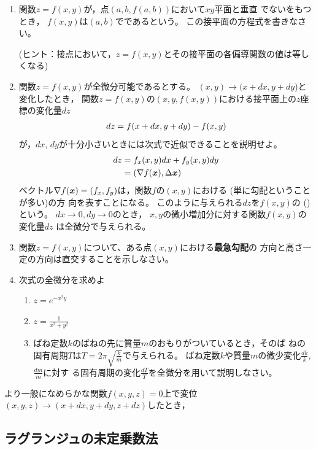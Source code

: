 \documentclass[twocolumn,11pt]{jarticle}
\begin{document}
\begin{enumerate}
\item 関数$z=f(x,y)$が，点$(a,b,f(a,b))$において$xy$平面と垂直
  でないをもつとき，
  $f(x,y)$は$(a,b)$でであるという。
  この接平面の方程式を書きなさい。

  (ヒント：接点において，$z=f(x,y)$とその接平面の各偏導関数の値は等し
  くなる)
\item 関数$z=f(x,y)$が全微分可能であるとする。
  $(x,y)\rightarrow (x+dx,y+dy$)と変化したとき，
  関数$z=f(x,y)$の$(x,y,f(x,y))$における接平面上の$z$座標の変化量$dz$
  \begin{align}
    dz=f(x+dx,y+dy)-f(x,y)\notag
  \end{align}
  が，$dx$, $dy$が十分小さいときには次式で近似できることを説明せよ。
  \begin{align}
    dz&=f_x(x,y)dx+f_y(x,y)dy\notag\\
    &=(\nabla {f}(\boldsymbol{x}),\Delta \boldsymbol{x})\notag
  \end{align}
  \comment
  ベクトル$\nabla f(\boldsymbol{x})=(f_x,f_y)$は，関数$f$の$(x,y)$における
  (単に勾配ということが多い)の方
  向を表すことになる。
  このように与えられる$dz$を$f(x,y)$の
  ()という。
  $dx\to 0,dy\to 0$のとき，
  $x,y$の微小増加分に対する関数$f(x,y)$の変化量$dz$
  は全微分で与えられる。
\item 関数$z=f(x,y)$について、ある点$(x,y)$における\textbf{最急勾配}の
  方向と高さ一定の方向は直交することを示しなさい。
\item 次式の全微分を求めよ
  \begin{enumerate}
  \item $z=e^{-x^2y}$
  \item $\displaystyle z=\frac{1}{x^2+y^2}$
  \item ばね定数$k$のばねの先に質量$m$のおもりがついているとき，そのば
    ねの固有周期$T$は$T=2\pi\sqrt{\frac{k}{m}}$で与えられる。
    ばね定数$k$や質量$m$の微少変化$\frac{dk}{k}$,$\frac{dm}{m}$に対す
    る固有周期の変化$\frac{dT}{T}$を全微分を用いて説明しなさい。
  \end{enumerate}
\end{enumerate}
\comment
より一般になめらかな関数$f(x,y,z)=0$上で変位
$(x,y,z)\rightarrow(x+dx,y+dy,z+dz)$したとき，%

\subsection{ラグランジュの未定乗数法}
\end{document}
